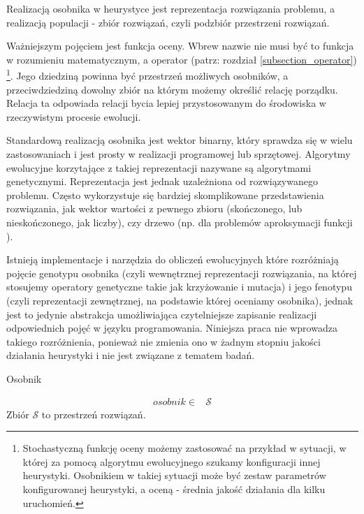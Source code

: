 \documentclass[twoside]{iisthesis}
\newcommand{\important}{\mathcal}
\begin{document}
Realizacją osobnika w heurystyce jest reprezentacja rozwiązania problemu, a realizacją populacji - zbiór rozwiązań, czyli podzbiór przestrzeni rozwiązań.

Ważniejszym pojęciem jest funkcja oceny. Wbrew nazwie nie musi być to funkcja w rozumieniu matematycznym, a operator (patrz: rozdział \ref{subsection_operator}) \footnote{Stochastyczną funkcję oceny możemy zastosować na przykład w sytuacji, w której za pomocą algorytmu ewolucyjnego szukamy konfiguracji innej heurystyki. Osobnikiem w takiej sytuacji może być zestaw parametrów konfigurowanej heurystyki, a oceną - średnia jakość działania dla kilku uruchomień.}. Jego dziedziną powinna być przestrzeń możliwych osobników, a przeciwdziedziną dowolny zbiór na którym możemy określić relację porządku. Relacja ta odpowiada relacji bycia lepiej przystosowanym do środowiska w rzeczywistym procesie ewolucji.

Standardową realizacją osobnika jest wektor binarny, który sprawdza się w wielu zastosowaniach i jest prosty w realizacji programowej lub sprzętowej. Algorytmy ewolucyjne korzytające z takiej reprezentacji nazywane są algorytmami genetycznymi. Reprezentacja jest jednak uzależniona od rozwiązywanego problemu. Często wykorzystuje się bardziej skomplikowane przedstawienia rozwiązania, jak wektor wartości z pewnego zbioru (skończonego, lub nieskończonego, jak liczby), czy drzewo \cite{gen_prog} (np. dla problemów aproksymacji funkcji \cite{gen_prog_foo_approx}).

Istnieją implementacje i narzędzia do obliczeń ewolucyjnych które rozróżniają pojęcie genotypu osobnika (czyli wewnętrznej reprezentacji rozwiązania, na której stosujemy operatory genetyczne takie jak krzyżowanie i mutacja) i jego fenotypu (czyli reprezentacji zewnętrznej, na podstawie której oceniamy osobnika), jednak jest to jedynie abstrakcja umożliwiająca czytelniejsze zapisanie realizacji odpowiednich pojęć w języku programowania. Niniejsza praca nie wprowadza takiego rozróżnienia, ponieważ nie zmienia ono w żadnym stopniu jakości działania heurystyki i nie jest związane z tematem badań.

\begin{signature}
	\caption{Osobnik \label{signature_specimen}}
	\begin{align}
	osobnik \in &\important{S}
	\end{align}
	Zbiór $\important{S}$ to przestrzeń rozwiązań.
\end{signature}
\end{document}

